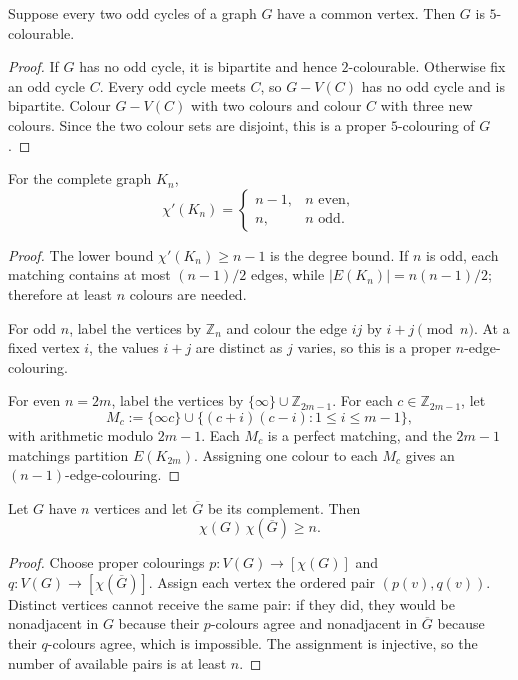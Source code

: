 \begin{noteexercise}
Suppose every two odd cycles of a graph $G$ have a common vertex.  Then
$G$ is $5$-colourable.
\end{noteexercise}
\begin{proof}
If $G$ has no odd cycle, it is bipartite and hence $2$-colourable.  Otherwise
fix an odd cycle $C$.  Every odd cycle meets $C$, so $G-V(C)$ has no odd cycle
and is bipartite.  Colour $G-V(C)$ with two colours and colour $C$ with three
new colours.  Since the two colour sets are disjoint, this is a proper
$5$-colouring of $G$.
\end{proof}
\begin{noteexercise}
For the complete graph $K_n$,
\[
  \chi'(K_n)=
  \begin{cases}
    n-1,& n\text{ even},\\
    n,& n\text{ odd}.
  \end{cases}
\]
\end{noteexercise}
\begin{proof}
The lower bound $\chi'(K_n)\ge n-1$ is the degree bound.  If $n$ is odd, each
matching contains at most $(n-1)/2$ edges, while
$|E(K_n)|=n(n-1)/2$; therefore at least $n$ colours are needed.

For odd $n$, label the vertices by $\mathbb Z_n$ and colour the edge $ij$ by
$i+j\pmod n$.  At a fixed vertex $i$, the values $i+j$ are distinct as
$j$ varies, so this is a proper $n$-edge-colouring.

For even $n=2m$, label the vertices by
$\{\infty\}\cup\mathbb Z_{2m-1}$.  For each
$c\in\mathbb Z_{2m-1}$, let
\[
  M_c
  :=\{\infty c\}
    \cup\bigl\{(c+i)(c-i):1\le i\le m-1\bigr\},
\]
with arithmetic modulo $2m-1$.  Each $M_c$ is a perfect matching, and the
$2m-1$ matchings partition $E(K_{2m})$.  Assigning one colour to each $M_c$
gives an $(n-1)$-edge-colouring.
\end{proof}
\begin{noteexercise}
Let $G$ have $n$ vertices and let $\overline G$ be its complement.  Then
\[
  \chi(G)\,\chi(\overline G)\ge n.
\]
\end{noteexercise}
\begin{proof}
Choose proper colourings
$p\colon V(G)\to[\chi(G)]$ and
$q\colon V(G)\to[\chi(\overline G)]$.  Assign each vertex the ordered pair
$(p(v),q(v))$.  Distinct vertices cannot receive the same pair: if they did,
they would be nonadjacent in $G$ because their $p$-colours agree and
nonadjacent in $\overline G$ because their $q$-colours agree, which is
impossible.  The assignment is injective, so the number of available pairs is
at least $n$.
\end{proof}
